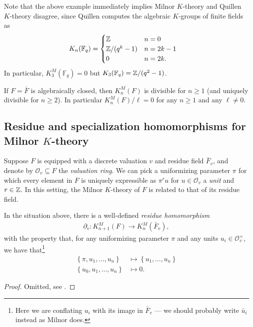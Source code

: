 \documentclass[11pt,openany]{book}
\let\del\partial
\begin{document}
\begin{remark} Note that the above example immediately implies Milnor $K$-theory and Quillen $K$-theory disagree, since Quillen computes the algebraic $K$-groups of finite fields as
\begin{align*}
    K_n(\mathbb{F}_q) &=
    \begin{cases}
    \mathbb{Z} & n = 0 \\
    \mathbb{Z}/(q^k-1) & n=2k-1 \\
    0 & n=2k.
    \end{cases}
\end{align*}
In particular, $K_3^M(\mathbb{F}_q) = 0$ but $K_3(\mathbb{F}_q) = \mathbb{Z}/(q^2-1)$.
\end{remark}

\begin{example} \cite[III.7.2]{Kbook}
If $F = \bar{F}$ is algebraically closed, then $K_n^M(F)$ is divisible for $n\ge1$ (and uniquely divisible for $n\ge 2$). In particular $K_n^M(F)/\ell = 0$ for any $n\ge 1$ and any $\ell\ne 0$.
\end{example}

\subsection{Residue and specialization homomorphisms for Milnor $K$-theory}
Suppose $F$ is equipped with a discrete valuation $v$ and residue field $\bar{F}_v$, and denote by $\mathcal{O}_v \subseteq F$ the \emph{valuation ring}. We can pick a uniformizing parameter $\pi$ for which every element in $F$ is uniquely expressible as $\pi^r u$ for $u\in \mathcal{O}_v$ a \emph{unit} and $r\in \mathbb{Z}$. In this setting, the Milnor $K$-theory of $F$ is related to that of its residue field.

\begin{lemma} In the situation above, there is a well-defined \emph{residue homomorphism}
\begin{equation}\label{eqn:Milnor-K-residue-homomorphism}
\begin{aligned}
    \del_v \colon K_{n+1}^M(F) \to K_n^M(\bar{F}_v),
\end{aligned}
\end{equation}
with the property that, for any uniformizing parameter $\pi$ and any units $u_i\in \mathcal{O}_v^\times$, we have that\footnote{Here we are conflating $u_i$ with its image in $\bar{F}_v$ --- we should probably write $\bar{u}_i$ instead as Milnor does.}
\begin{align*}
    \left\{ \pi, u_1, \ldots, u_n \right\} &\mapsto \left\{ u_1, \ldots, u_n \right\} \\
    \left\{ u_0,u_1, \ldots, u_n \right\}&\mapsto 0.
\end{align*}
\end{lemma}
\begin{proof} Omitted, see \cite[\S2]{MilnorK}.
\end{proof}
\end{document}
